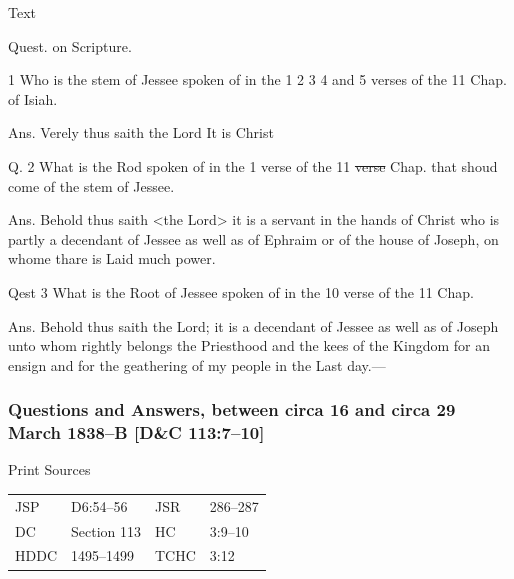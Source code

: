 				\begin{description}
					\item[Text]
				\end{description}
				
					Quest. on Scripture.

					1 Who is the stem of Jessee spoken of in the 1\supers{.} 2\supersu{d} 3 4\supersu{th} and 5 verses of the 11 Chap. of Isiah.

					Ans. Verely thus saith the Lord It is Christ

					Q. 2 What is the Rod spoken of in the 1 verse of the 11 \sout{verse} Chap. that shoud come of the stem of Jessee.

					Ans. Behold thus saith <the Lord> it is a servant in the hands of Christ who is partly a decendant of Jessee as well as of Ephraim or of the house of Joseph, on whome thare is Laid much power.

					Qest 3 What is the Root of Jessee spoken of in the 10 verse of the 11 Chap.

					Ans. Behold thus saith the Lord; it is a decendant of Jessee as well as of Joseph unto whom rightly belongs the Priesthood and the kees of the Kingdom for an ensign and for the geathering of my people in the Last day.---
					
		\subsubsection{Questions and Answers, between circa 16 and circa 29 March 1838--B [D\&C 113:7--10]}
			\label{EMS-1838-JS-CIR-16-CIR-29-MAR-1838-B}
			
			\begin{description}
					\item[Print Sources]
				\end{description}

					\begin{tabular}{p{0.5in}p{1in}p{0.5in}p{1in}}
					JSP	 	& D6:54--56				& JSR 		& 286--287 \\
					DC	 	& Section 113		& HC 		& 3:9--10 \\
					HDDC 	& 1495--1499		& TCHC 		& 3:12 \\
					\end{tabular}
				
